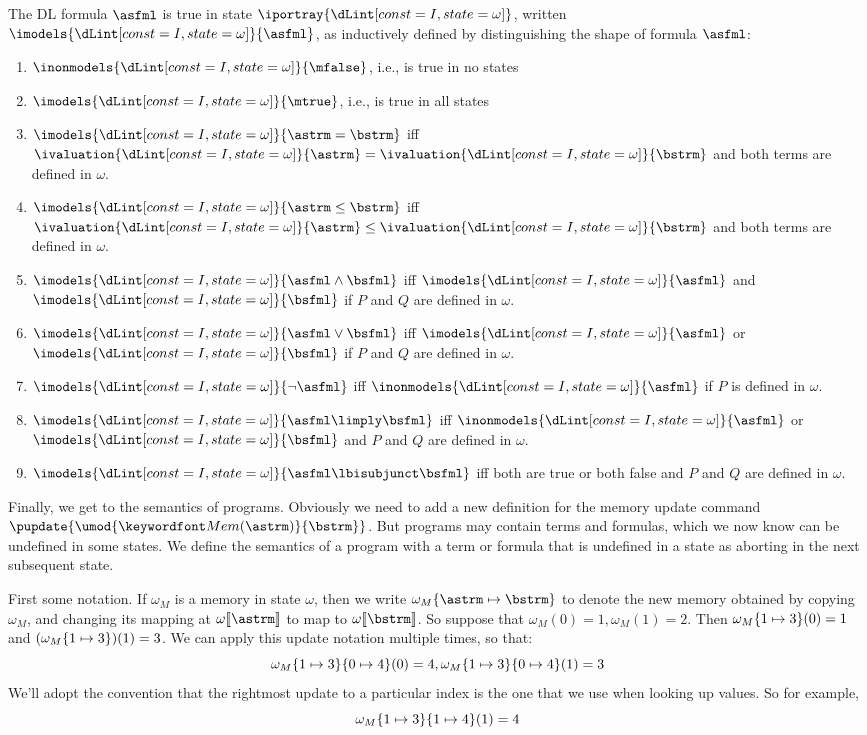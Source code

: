\documentclass[11pt,twoside]{scrartcl}
\begin{document}
\begin{definition} \label{def:arithmetic-semantics}
The DL formula $\asfml$ is true in state $\iportray{\I}$, written \(\imodels{\I}{\asfml}\), as inductively defined by distinguishing the shape of formula $\asfml$:
\begin{enumerate}
\item \(\inonmodels{\I}{\mfalse}\), i.e., \mfalse is true in no states
\item \(\imodels{\I}{\mtrue}\), i.e., \mtrue is true in all states
\item \(\imodels{\I}{\astrm=\bstrm}\) iff \(\ivaluation{\I}{\astrm}=\ivaluation{\I}{\bstrm}\) and both terms are defined in $\omega$.
\item \(\imodels{\I}{\astrm\leq\bstrm}\) iff \(\ivaluation{\I}{\astrm}\leq\ivaluation{\I}{\bstrm}\) and both terms are defined in $\omega$.
\item \(\imodels{\I}{\asfml\land\bsfml}\) iff \(\imodels{\I}{\asfml}\) and \(\imodels{\I}{\bsfml}\) if $P$ and $Q$ are defined in $\omega$.
\item \(\imodels{\I}{\asfml\lor\bsfml}\) iff \(\imodels{\I}{\asfml}\) or \(\imodels{\I}{\bsfml}\)  if $P$ and $Q$ are defined in $\omega$.
\item \(\imodels{\I}{\lnot\asfml}\) iff \(\inonmodels{\I}{\asfml}\) if $P$ is defined in $\omega$.
\item \(\imodels{\I}{\asfml\limply\bsfml}\) iff \(\inonmodels{\I}{\asfml}\) or \(\imodels{\I}{\bsfml}\) and $P$ and $Q$ are defined in $\omega$.
\item \(\imodels{\I}{\asfml\lbisubjunct\bsfml}\) iff both are true or both false and $P$ and $Q$ are defined in $\omega$.
\end{enumerate}
\end{definition}

Finally, we get to the semantics of programs. Obviously we need to add a new definition for the memory update command $\pupdate{\umod{\pderef{\astrm}}{\bstrm}}$. But programs may contain terms and formulas, which we now know can be undefined in some states. We define the semantics of a program with a term or formula that is undefined in a state as aborting in the next subsequent state.

First some notation.
If $\omega_M$ is a memory in state $\omega$, then we write $\memupd{\omega_M}{\astrm}{\bstrm}$ to denote the new memory obtained by copying $\omega_M$, and changing its mapping at $\omega\llbracket\astrm\rrbracket$ to map to $\omega\llbracket\bstrm\rrbracket$. So suppose that $\omega_M(0) = 1, \omega_M(1) = 2$. Then $\omega_M\{1\mapsto3\}(0) = 1$ and  $(\omega_M\{1\mapsto3\})(1) = 3$. We can apply this update notation multiple times, so that:
\[
\omega_M\{1\mapsto3\}\{0\mapsto4\}(0) = 4, \omega_M\{1\mapsto3\}\{0\mapsto4\}(1) = 3
\]
We'll adopt the convention that the rightmost update to a particular index is the one that we use when looking up values. So for example,
\[
\omega_M\{1\mapsto3\}\{1\mapsto4\}(1) = 4
\]
\end{document}
